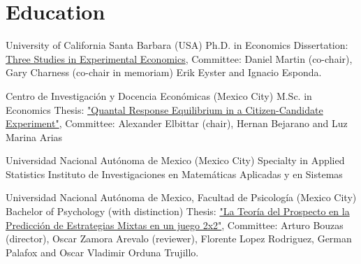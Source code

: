 \section{Education}

{University of California Santa Barbara (USA)}
{Ph.D. in Economics}
{}{}
{Dissertation: \href{https://escholarship.org/uc/item/8fj0g1tg}{Three Studies in Experimental Economics}, 
	Committee:
	Daniel Martin (co-chair),
	Gary Charness (co-chair in memoriam)
	Erik Eyster and
	Ignacio Esponda.
}

{Centro de Investigación y Docencia Económicas (Mexico City)}
{M.Sc. in Economics}
{}{}
{Thesis: \href{http://repositorio-digital.cide.edu/handle/11651/1719?show=full}{"Quantal Response Equilibrium in a Citizen-Candidate Experiment"}, 
	Committee: Alexander Elbittar (chair), Hernan Bejarano and Luz Marina Arias}

{Universidad Nacional Autónoma de Mexico (Mexico City)}
{Specialty in Applied Statistics}
{}{}
{Instituto de Investigaciones en Matemáticas Aplicadas y en Sistemas }

{Universidad Nacional Autónoma de Mexico, Facultad de Psicología (Mexico City)}
{Bachelor of Psychology (with distinction)}
{}{}
{Thesis: \href{http://132.248.9.195/ptd2013/noviembre/0706151/Index.html}{"La Teoría del Prospecto en la Predicción de Estrategias Mixtas en un juego 2x2"}, 
	Committee: Arturo Bouzas (director), Oscar Zamora Arevalo (reviewer), Florente Lopez Rodriguez, German Palafox and Oscar Vladimir Orduna Trujillo.} %






